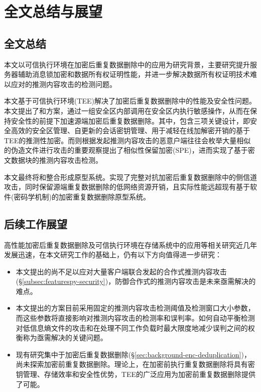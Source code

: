 \chapter{全文总结与展望}

\section{全文总结}

本文以可信执行环境在加密后重复数据删除中的应用为研究背景，主要研究提升服务器辅助消息锁加密和数据所有权证明性能，并进一步解决数据所有权证明技术难以应对的推测内容攻击的检测问题。

本文基于可信执行环境(TEE)解决了加密后重复数据删除中的性能及安全性问题。本文提出了\sysnameS 和\sysnameF 方案，通过一组安全区内部调用在安全区内执行敏感操作，从而在保持安全性的前提下加速源端加密后重复数据删除。其中，\sysnameS 包含三项关键设计，即安全高效的安全区管理、自更新的会话密钥管理、用于减轻在线加解密开销的基于TEE的推测性加密。而\sysnameF 则根据发起推测内容攻击的恶意户端往往会枚举大量相似的伪造文件进行攻击的重要观察提出了相似性保留加密(SPE)，进而实现了基于密文数据块的推测内容攻击检测。

本文最终将\sysnameS 和\sysnameF 整合形成\prototype 原型系统。实现了完整对抗加密后重复数据删除中的侧信道攻击，同时保留源端重复数据删除的低网络资源开销，且实际性能远超现有基于软件(密码学机制)的加密重复数据删除原型系统。

\section{后续工作展望}

高性能加密后重复数据删除及可信执行环境在存储系统中的应用等相关研究近几年发展迅速，在本文研究工作的基础上，仍有以下方向值得进一步研究：

\begin{itemize}[leftmargin=0em]
    \item 本文提出的\sysnameF 尚不足以应对大量客户端联合发起的合作式推测内容攻击(\S\ref{subsec:featurespy-security})，防御合作式的推测内容攻击是未来亟需解决的难点。
    \item 本文提出的\sysnameF 方案目前采用固定的推测内容攻击检测阈值及检测窗口大小参数，而这些参数将直接影响对推测内容攻击的检测率和误判率。如何自动平衡检测对低信息熵文件的攻击和在处理不同工作负载时最大限度地减少误判之间的权衡称为亟需解决的关键问题。
    \item 现有研究集中于加密后重复数据删除(\S\ref{sec:background-enc-deduplication})，尚未探索加密前重复数据删除。理论上，在加密前执行重复数据删除将具有密钥管理、存储效率和安全性优势，TEE的广泛应用为加密前重复数据删除提供了可能。
\end{itemize}
